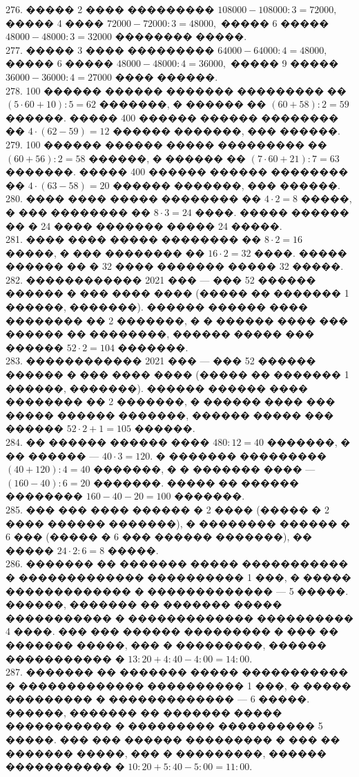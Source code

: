\documentclass[12pt]{article}
\begin{document}
276. ����� 2 ���� ��������� $108000-108000:3=72000,$ ����� 4 ���� $72000-72000:3=48000,$ ����� 6 ����� $48000-48000:3=32000$ �������� �����.\\
277. ����� 3 ���� ��������� $64000-64000:4=48000,$ ����� 6 ����� $48000-48000:4=36000,$ ����� 9 ����� $36000-36000:4=27000$ ���� ������.\\
278. 100 ������ ������ ������� ��������� �� $(5\cdot60+10):5=62$ �������, � ������ �� $(60+58):2=59$ ������. ����� 400 ������ ������ �������� �� $4\cdot(62-59)=12$ ������ �������, ��� ������.\\
279. 100 ������ ������ ����� ��������� �� $(60+56):2=58$ ������, � ������ �� $(7\cdot60+21):7=63$ �������. ����� 400 ������ ������ �������� �� $4\cdot(63-58)=20$ ������ �������, ��� ������.\\
280. ���� ���� ����� �������� �� $4\cdot2=8$ �����, � ��� �������� �� $8\cdot3=24$ ����. ����� ������ �� � 24 ���� ������� ����� 24 �����.\\
281. ���� ���� ����� �������� �� $8\cdot2=16$ �����, � ��� �������� �� $16\cdot2=32$ ����. ����� ������ �� � 32 ���� ������� ����� 32 �����.\\
282. ������������ 2021 ��� --- ��� 52 ������ ������ � ��� ���� ���� (����� �� ������� 1 ������, �������). ������ ������ ���� �������� �� 2 �������, � � ������ ���� ��� ������ �� ��������, ������ ����� ��� ������ $52\cdot2=104$ �������.\\
283. ������������ 2021 ��� --- ��� 52 ������ ������ � ��� ���� ���� (����� �� ������� 1 ������, �������). ������ ������ ���� �������� �� 2 �������, � ������ ���� ��� ����� ������ �������, ������ ����� ��� ������ $52\cdot2+1=105$ ������.\\
284. �� ������ ������ ���� $480:12=40$ �������, � �� ������ --- $40\cdot3=120.$ � ������� ��������� $(40+120):4=40$ �������, � � ������� ���� --- $(160-40):6=20$ �������. ����� �� ������ �������� $160-40-20=100$ �������.\\
285. ��� ��� ���� ������ � 2 ���� (����� � 2 ���� ������ �������), � �������� ������ � 6 ��� (����� � 6 ��� ������ �������), �� ����� $24\cdot2:6=8$ �����.\\
286. ������� �� ������� ����� ����������� � ������������� ���������� 1 ���, � ����� ������������� � ������������� --- 5 �����. ������, ������� �� ������� ����� ����������� � ������������� ���������� 4 ����. ��� ��� ������ ��������� � ��� �� ������� �����, ��� � ���������, ������ ����������� � $13:20+4:40-4:00=14:00.$\\
287. ������� �� ������� ����� ����������� � ������������� ���������� 1 ���, � ����� ��������� � ������������� --- 6 �����. ������, ������� �� ������� ����� ����������� � ��������� ���������� 5 �����. ��� ��� ������ ��������� � ��� �� ������� �����, ��� � ���������, ������ ����������� � $10:20+5:40-5:00=11:00.$\\
\end{document}
